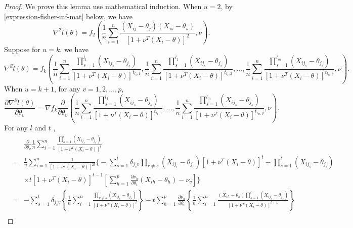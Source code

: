 \documentclass[oneside,english]{amsbook}
\numberwithin{section}{chapter}
\numberwithin{equation}{section}
\numberwithin{figure}{section}
\theoremstyle{plain}
\theoremstyle{plain}
\theoremstyle{definition}
\theoremstyle{plain}
\theoremstyle{plain}
\theoremstyle{remark}
\theoremstyle{definition}
\theoremstyle{definition}
\begin{document}
\begin{proof}
We prove this lemma use mathematical induction. When $u=2$, by \eqref{expression-fisher-inf-mat}
below, we have 
\[
\nabla^{2}\hat{l}\left(\theta\right)=f_{2}\left(\frac{1}{n}\sum_{i=1}^{n}\frac{\left(X_{ij}-\theta_{j}\right)\left(X_{is}-\theta_{s}\right)}{\left[1+\nu^{T}\left(X_{i}-\theta\right)\right]^{2}},\nu\right).
\]
Suppose for $u=k$, we have 
\[
\nabla^{k}\hat{l}\left(\theta\right)=f_{k}\left(\frac{1}{n}\sum_{i=1}^{n}\frac{\prod_{s=1}^{l_{1}}\left(X_{ij_{s}}-\theta_{j_{s}}\right)}{\left[1+\nu^{T}\left(X_{i}-\theta\right)\right]^{t_{l_{1},1}}},\frac{1}{n}\sum_{i=1}^{n}\frac{\prod_{s=1}^{l_{1}}\left(X_{ij_{s}}-\theta_{j_{s}}\right)}{\left[1+\nu^{T}\left(X_{i}-\theta\right)\right]^{t_{l_{1},2}}},\ldots,\frac{1}{n}\sum_{i=1}^{n}\frac{\prod_{s=1}^{l_{m}}\left(X_{ij_{s}}-\theta_{j_{s}}\right)}{\left[1+\nu^{T}\left(X_{i}-\theta\right)\right]^{t_{l_{m},q}}},\nu\right).
\]
When $u=k+1$, for any $v=1,2,\ldots,p$, 
\[
\frac{\partial\nabla^{k}\hat{l}\left(\theta\right)}{\partial\theta_{v}}=\nabla f_{k}\frac{\partial}{\partial\theta_{v}}\left(\frac{1}{n}\sum_{i=1}^{n}\frac{\prod_{s=1}^{l_{1}}\left(X_{ij_{s}}-\theta_{j_{s}}\right)}{\left[1+\nu^{T}\left(X_{i}-\theta\right)\right]^{t_{l_{1},1}}},\ldots,\frac{1}{n}\sum_{i=1}^{n}\frac{\prod_{s=1}^{l_{m}}\left(X_{ij_{s}}-\theta_{j_{s}}\right)}{\left[1+\nu^{T}\left(X_{i}-\theta\right)\right]^{t_{l_{m},q}}},\nu\right).
\]
For any $l$ and $t$ , 
\begin{eqnarray*}
 &  & \frac{\partial}{\partial\theta_{v}}\frac{1}{n}\sum_{i=1}^{n}\frac{\prod_{s=1}^{l}\left(X_{ij_{s}}-\theta_{j_{s}}\right)}{\left[1+\nu^{T}\left(X_{i}-\theta\right)\right]^{t}}\\
 & = & \frac{1}{n}\sum_{i=1}^{n}\frac{1}{\left[1+\nu^{T}\left(X_{i}-\theta\right)\right]^{2t}}\Bigg\{-\sum_{s=1}^{l}\delta_{j_{s}v}\prod_{r\neq s}\left(X_{ij_{r}}-\theta_{j_{r}}\right)\left[1+\nu^{T}\left(X_{i}-\theta\right)\right]^{t}-\prod_{s=1}^{l}\left(X_{ij_{s}}-\theta_{j_{s}}\right)\\
 &  & \times t\left[1+\nu^{T}\left(X_{i}-\theta\right)\right]^{t-1}\left[\sum_{h=1}^{p}\frac{\partial\nu_{h}}{\partial\theta_{t}}\left(X_{ih}-\theta_{h}\right)-\nu_{v}\right]\Bigg\}\\
 & = & -\sum_{s=1}^{l}\delta_{j_{s}v}\left\{ \frac{1}{n}\sum_{i=1}^{n}\frac{\prod_{r\neq s}\left(X_{ij_{r}}-\theta_{j_{r}}\right)}{\left[1+\nu^{T}\left(X_{i}-\theta\right)\right]^{t}}\right\} -t\sum_{h=1}^{p}\frac{\partial\nu_{h}}{\partial\theta_{t}}\left\{ \frac{1}{n}\sum_{i=1}^{n}\frac{\left(X_{ih}-\theta_{h}\right)\prod_{s=1}^{l}\left(X_{ij_{s}}-\theta_{j_{s}}\right)}{\left[1+\nu^{T}\left(X_{i}-\theta\right)\right]^{t+1}}\right\} \\

\end{eqnarray*}
\end{proof}
\end{document}
